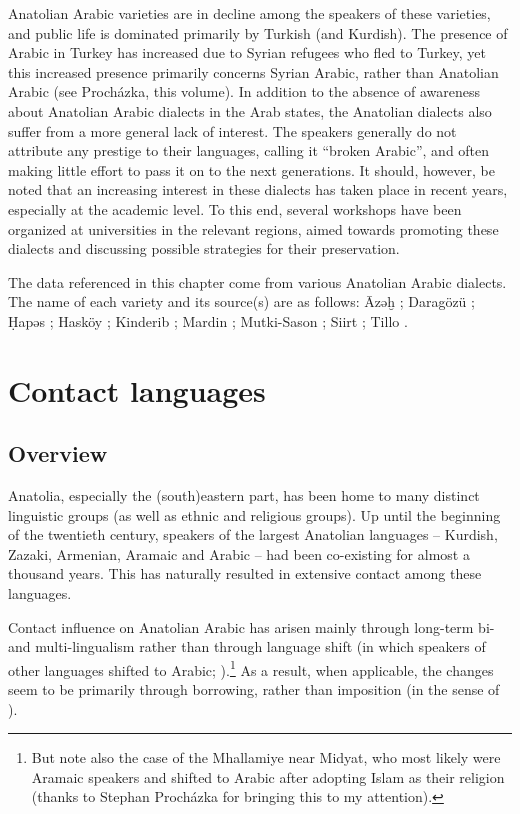 \documentclass[output=paper]{langsci/langscibook}
\begin{document}
Anatolian Arabic varieties are in decline among the speakers of these varieties, and public life is dominated primarily by Turkish (and Kurdish). The presence of Arabic in Turkey has increased due to Syrian refugees who fled to Turkey, yet this increased presence primarily concerns Syrian Arabic, rather than Anatolian Arabic (see Proch\'{a}zka, this volume). In addition to the absence of awareness about Anatolian Arabic dialects in the Arab states, the Anatolian dialects also suffer from a more general lack of interest. The speakers generally do not attribute any prestige to their languages, calling it ``broken Arabic'', and often making little effort to pass it on to the next generations. It should, however, be noted that an increasing interest in these dialects has taken place in recent years, especially at the academic level. To this end, several workshops have been organized at universities in the relevant regions, aimed towards promoting these dialects and discussing possible strategies for their preservation.  

The data referenced in this chapter come from various Anatolian Arabic dialects. The name of each variety and its source(s) are as follows: \={A}zəḫ \citep{Wittrich2001}; Darag\"{o}z\"{u} \citep{Jastrow1973}; \d{H}apəs \citep{Talay2007}; Hask\"{o}y \citep{Talay2001,Talay2002}; Kinderib \citep{Jastrow1978};  Mardin  \citep{Jastrow2006,Grigore2007article,GrigoreBituna2012}; Mutki-Sason \citep{Akkus2016,Akkus2017,Isaksson2005}; Siirt \citep{Bituna2016,GrigoreBituna2012}; Tillo \citep{Lahdo2009}.

\section{Contact languages}

\subsection{Overview}
Anatolia, especially the (south)eastern part, has been home to many distinct linguistic groups (as well as ethnic and religious groups). Up until the beginning of the twentieth century, speakers of the largest Anatolian languages -- Kurdish, Zazaki, Armenian, Aramaic and Arabic -- had been co-existing for almost a thousand years. This has naturally resulted in extensive contact among these languages.  

Contact influence on Anatolian Arabic has arisen mainly through long-term bi- and multi-lingualism rather than through language shift (in which speakers of other languages shifted to Arabic; \citealt{Thomason2001}).\footnote{But note also the case of the Mhallamiye near Midyat, who most likely were Aramaic speakers and shifted to Arabic after adopting Islam as their religion (thanks to Stephan Procházka for bringing this to my attention).} As a result, when applicable, the changes seem to be primarily through borrowing, rather than imposition (in the sense of \citealt{VanCoetsem1988,VanCoetsem2000}). 
\end{document}
